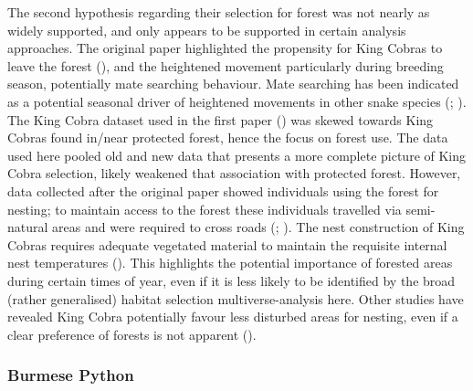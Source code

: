 \documentclass[10pt,a4paper]{article}
\begin{document}
The second hypothesis regarding their selection for forest was not nearly as widely supported, and only appears to be supported in certain analysis approaches.
The original paper highlighted the propensity for King Cobras to leave the forest (), and the heightened movement particularly during breeding season, potentially mate searching behaviour.
Mate searching has been indicated as a potential seasonal driver of heightened movements in other snake species (; ).
The King Cobra dataset used in the first paper () was skewed towards King Cobras found in/near protected forest, hence the focus on forest use.
The data used here pooled old and new data that presents a more complete picture of King Cobra selection, likely weakened that association with protected forest.
However, data collected after the original paper showed individuals using the forest for nesting; to maintain access to the forest these individuals travelled via semi-natural areas and were required to cross roads (; ).
The nest construction of King Cobras requires adequate vegetated material to maintain the requisite internal nest temperatures ().
This highlights the potential importance of forested areas during certain times of year, even if it is less likely to be identified by the broad (rather generalised) habitat selection multiverse-analysis here.
Other studies have revealed King Cobra potentially favour less disturbed areas for nesting, even if a clear preference of forests is not apparent ().

\subsubsection{Burmese Python}\label{burmese-python-1}
\end{document}
